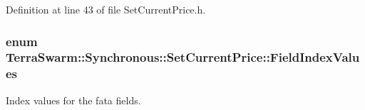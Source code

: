 Definition at line 43 of file Set\-Current\-Price.\-h.

\hypertarget{class_terra_swarm_1_1_synchronous_1_1_set_current_price_a1e2f6ce793cf79b121b76b6903e9df58}{
\subsubsection[{Field\-Index\-Values}]{\setlength{\rightskip}{0pt plus 5cm}enum {\bf Terra\-Swarm\-::\-Synchronous\-::\-Set\-Current\-Price\-::\-Field\-Index\-Values}\hspace{0.3cm}{\ttfamily [private]}}}\label{class_terra_swarm_1_1_synchronous_1_1_set_current_price_a1e2f6ce793cf79b121b76b6903e9df58}


Index values for the fata fields. 

